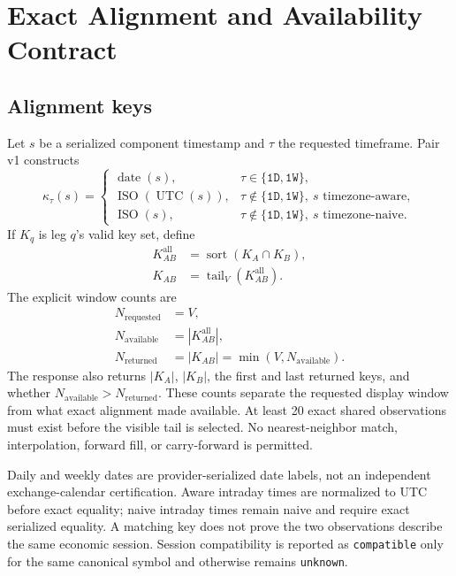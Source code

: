 \documentclass{article}
\newcommand{\tail}{\operatorname{tail}}
\begin{document}
\section{Exact Alignment and Availability Contract}

\subsection{Alignment keys}

Let $s$ be a serialized component timestamp and $\tau$ the requested timeframe. Pair v1 constructs
\begin{equation}
\kappa_\tau(s)=
\begin{cases}
\operatorname{date}(s), & \tau\in\{\texttt{1D},\texttt{1W}\},\\
\operatorname{ISO}(\operatorname{UTC}(s)), &
    \tau\notin\{\texttt{1D},\texttt{1W}\},\ s\text{ timezone-aware},\\
\operatorname{ISO}(s), &
    \tau\notin\{\texttt{1D},\texttt{1W}\},\ s\text{ timezone-naive}.
\end{cases}
\label{eq:key}
\end{equation}
If $K_q$ is leg $q$'s valid key set, define
\begin{align}
K^{\mathrm{all}}_{AB} &=
    \operatorname{sort}(K_A\cap K_B),\\
K_{AB} &= \tail_V(K^{\mathrm{all}}_{AB}).
\label{eq:intersection}
\end{align}
The explicit window counts are
\begin{align}
N_{\mathrm{requested}}&=V,\\
N_{\mathrm{available}}&=|K^{\mathrm{all}}_{AB}|,\\
N_{\mathrm{returned}}&=|K_{AB}|
=\min(V,N_{\mathrm{available}}).
\label{eq:window-counts}
\end{align}
The response also returns $|K_A|$, $|K_B|$, the first and last returned keys,
and whether $N_{\mathrm{available}}>N_{\mathrm{returned}}$. These counts
separate the requested display window from what exact alignment made available.
At least 20 exact shared observations must exist before the visible tail is selected. No nearest-neighbor match, interpolation, forward fill, or carry-forward is permitted.

Daily and weekly dates are provider-serialized date labels, not an independent exchange-calendar certification. Aware intraday times are normalized to UTC before exact equality; naive intraday times remain naive and require exact serialized equality. A matching key does not prove the two observations describe the same economic session. Session compatibility is reported as \texttt{compatible} only for the same canonical symbol and otherwise remains \texttt{unknown}.
\end{document}
